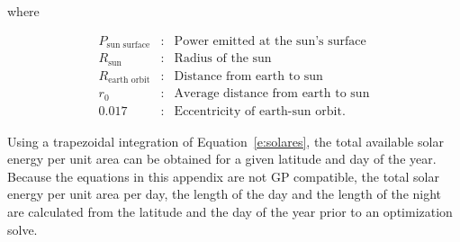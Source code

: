     where 

    \[ \begin{array}{lcl}
        P_{\text{sun surface}} & : & \text{Power emitted at the sun's surface} \\
        R_{\text{sun}} & : & \text{Radius of the sun} \\
        R_{\text{earth orbit}} & : & \text{Distance from earth to sun} \\
        r_0 & : & \text{Average distance from earth to sun} \\
        0.017 & : & \text{Eccentricity of earth-sun orbit}.
    \end{array} \]

    Using a trapezoidal integration of Equation~\eqref{e:solares}, the total available solar energy per unit area can be obtained for a given latitude and day of the year. Because the equations in this appendix are not GP compatible, the total solar energy per unit area per day, the length of the day and the length of the night are calculated from the latitude and the day of the year prior to an optimization solve.




